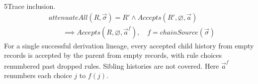 \begin{perchstatement}{5}{Trace inclusion.}\label{stmt:trace-inclusion}
\[\begin{aligned}&\mathit{attenuateAll}(R, \vec\sigma) = R' \land \mathit{Accepts}(R', \varnothing, \vec a)\\
&\qquad \implies \mathit{Accepts}(R, \varnothing, \vec a^{f}), \quad f = \mathit{chainSource}(\vec\sigma)\end{aligned}\]
For a single successful derivation lineage, every accepted child history from empty records is accepted by the parent from empty records, with rule choices renumbered past dropped rules. Sibling histories are not covered. Here \(\vec a^{f}\) renumbers each choice \(j\) to \(f(j)\).
\end{perchstatement}
